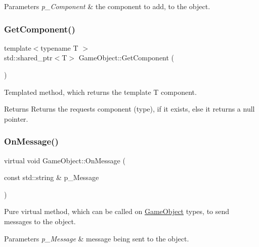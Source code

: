 \begin{DoxyParams}{Parameters}
{\em p\+\_\+\+Component} & the component to add, to the object. \\
\hline
\end{DoxyParams}
\mbox{\label{class_game_object_aae4f7351aa098e152f1f74988e458085}} 
\subsubsection{\texorpdfstring{GetComponent()}{GetComponent()}}
{\footnotesize\ttfamily template$<$typename T $>$ \\
std\+::shared\+\_\+ptr$<$T$>$ Game\+Object\+::\+Get\+Component (\begin{DoxyParamCaption}{ }\end{DoxyParamCaption})\hspace{0.3cm}{\ttfamily [inline]}}



Templated method, which returns the template T component. 

\begin{DoxyReturn}{Returns}
Returns the requests component (type), if it exists, else it returns a null pointer. 
\end{DoxyReturn}
\mbox{\label{class_game_object_a162f15f809f5181e3264b9f4d768bea2}} 
\subsubsection{\texorpdfstring{OnMessage()}{OnMessage()}}
{\footnotesize\ttfamily virtual void Game\+Object\+::\+On\+Message (\begin{DoxyParamCaption}\item[{const std\+::string \&}]{p\+\_\+\+Message }\end{DoxyParamCaption})\hspace{0.3cm}{\ttfamily [pure virtual]}}



Pure virtual method, which can be called on \mbox{\hyperlink{class_game_object}{Game\+Object}} types, to send messages to the object. 


\begin{DoxyParams}{Parameters}
{\em p\+\_\+\+Message} & message being sent to the object. \\
\hline
\end{DoxyParams}


